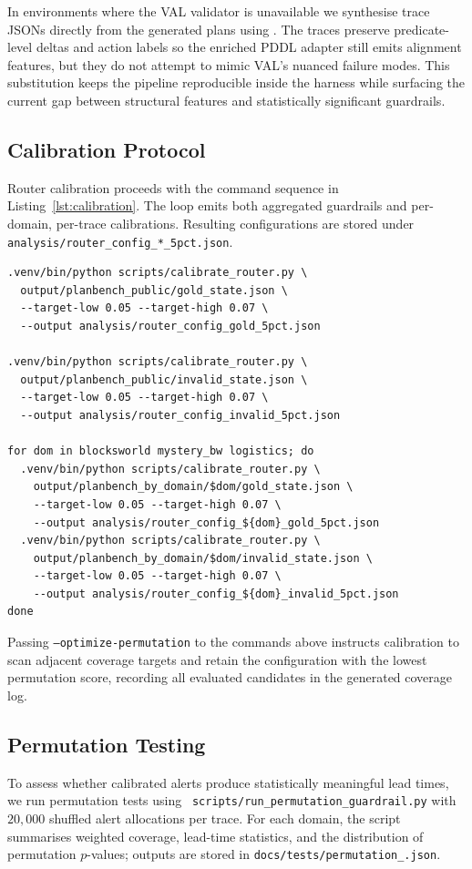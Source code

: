 \documentclass[11pt]{article}
\begin{document}
In environments where the VAL validator is unavailable we synthesise trace JSONs
directly from the generated plans using .
The traces preserve predicate-level deltas and action labels so the enriched
PDDL adapter still emits alignment features, but they do not attempt to mimic
VAL's nuanced failure modes. This substitution keeps the pipeline reproducible
inside the harness while surfacing the current gap between structural features
and statistically significant guardrails.

\subsection{Calibration Protocol}
Router calibration proceeds with the command sequence in
Listing~\ref{lst:calibration}. The loop emits both aggregated guardrails and
per-domain, per-trace calibrations. Resulting configurations are stored under
\texttt{analysis/router\_config\_*\_5pct.json}.

\begin{lstlisting}[style=stm, caption={Router calibration commands.}, label={lst:calibration}]
.venv/bin/python scripts/calibrate_router.py \
  output/planbench_public/gold_state.json \
  --target-low 0.05 --target-high 0.07 \
  --output analysis/router_config_gold_5pct.json

.venv/bin/python scripts/calibrate_router.py \
  output/planbench_public/invalid_state.json \
  --target-low 0.05 --target-high 0.07 \
  --output analysis/router_config_invalid_5pct.json

for dom in blocksworld mystery_bw logistics; do
  .venv/bin/python scripts/calibrate_router.py \
    output/planbench_by_domain/$dom/gold_state.json \
    --target-low 0.05 --target-high 0.07 \
    --output analysis/router_config_${dom}_gold_5pct.json
  .venv/bin/python scripts/calibrate_router.py \
    output/planbench_by_domain/$dom/invalid_state.json \
    --target-low 0.05 --target-high 0.07 \
    --output analysis/router_config_${dom}_invalid_5pct.json
done
\end{lstlisting}

Passing \texttt{--optimize-permutation} to the commands above instructs
calibration to scan adjacent coverage targets and retain the configuration with
the lowest permutation score, recording all evaluated candidates in the
generated coverage log.

\subsection{Permutation Testing}
\label{subsec:permutation}
To assess whether calibrated alerts produce statistically meaningful lead times,
we run permutation tests using \
\texttt{scripts/run\_permutation\_guardrail.py} with $20{,}000$ shuffled alert
allocations per trace. For each domain, the script summarises weighted coverage,
lead-time statistics, and the distribution of permutation $p$-values; outputs are
stored in \texttt{docs/tests/permutation\_\*.json}.
\end{document}
